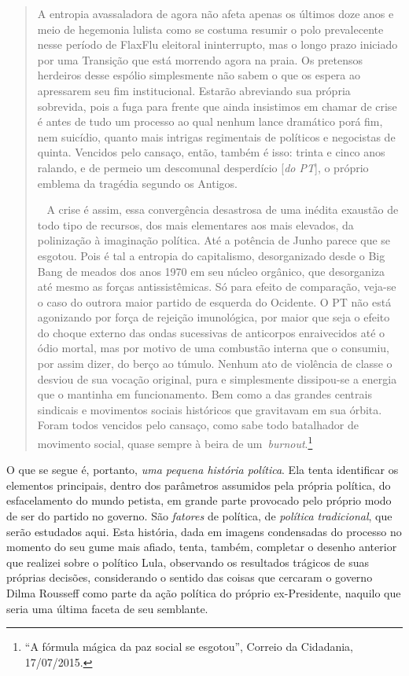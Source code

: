 \begin{quote}
A entropia avassaladora de agora não afeta apenas os últimos doze anos
e meio de hegemonia lulista como se costuma resumir o polo prevalecente
nesse período de FlaxFlu eleitoral ininterrupto, mas o longo prazo
iniciado por uma Transição que está morrendo agora na praia. Os
pretensos herdeiros desse espólio simplesmente não sabem o que os espera
ao apressarem seu fim institucional. Estarão abreviando sua própria
sobrevida, pois a fuga para frente que ainda insistimos em chamar de
crise é antes de tudo um processo ao qual nenhum lance dramático porá
fim, nem suicídio, quanto mais intrigas regimentais de políticos e
negocistas de quinta. Vencidos pelo cansaço, então, também é isso:
trinta e cinco anos ralando, e de permeio um descomunal desperdício
{[}\emph{do PT}{]}, o próprio emblema da tragédia segundo os Antigos.

~ A crise é assim, essa convergência desastrosa de uma inédita exaustão
de todo tipo de recursos, dos mais elementares aos mais elevados, da
polinização à imaginação política. Até a potência de Junho parece que se
esgotou. Pois é tal a entropia do capitalismo, desorganizado desde o Big
Bang de meados dos anos 1970 em seu núcleo orgânico, que desorganiza até
mesmo as forças antissistêmicas. Só para efeito de comparação, veja-se o
caso do outrora maior partido de esquerda do Ocidente. O PT não está
agonizando por força de rejeição imunológica, por maior que seja o
efeito do choque externo das ondas sucessivas de anticorpos enraivecidos
até o ódio mortal, mas por motivo de uma combustão interna que o
consumiu, por assim dizer, do berço ao túmulo. Nenhum ato de violência
de classe o desviou de sua vocação original, pura e simplesmente
dissipou-se a energia que o mantinha em funcionamento. Bem como a das
grandes centrais sindicais e movimentos sociais históricos que
gravitavam em sua órbita. Foram todos vencidos pelo cansaço, como sabe
todo batalhador de movimento social, quase sempre à beira de
um~\emph{burnout}.\footnote{``A fórmula mágica da paz social se
  esgotou'', Correio da Cidadania,
17/07/2015.}
\end{quote} 

O que se segue é, portanto, \emph{uma pequena história política}. Ela
tenta identificar os elementos principais, dentro dos parâmetros
assumidos pela própria política, do esfacelamento do mundo petista, em
grande parte provocado pelo próprio modo de ser do partido no governo.
São \emph{fatores} de política, de \emph{política tradicional}, que
serão estudados aqui. Esta história, dada em imagens condensadas do
processo no momento do seu gume mais afiado, tenta, também, completar o
desenho anterior que realizei sobre o político Lula, observando os
resultados trágicos de suas próprias decisões, considerando o sentido
das coisas que cercaram o governo Dilma Rousseff como parte da ação
política do próprio ex-Presidente, naquilo que seria uma última faceta
de seu semblante.

